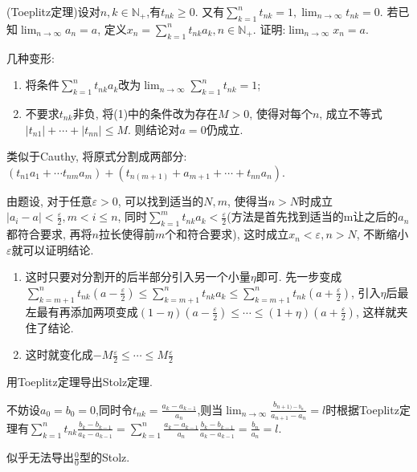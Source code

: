      \begin{exercise}
         (Toeplitz定理)设对$n,k\in \mathbb{N}_+$,有$t_{nk}\geqslant 0$. 又有$\sum_{k=1}^{n}t_{nk}=1, \lim_{n\to\infty}t_{nk}=0$. 若已知$\lim_{n\to\infty}a_n=a$, 定义$x_n=\sum_{k=1}^{n}t_{nk}a_k, n\in \mathbb{N}_+$. 证明:$\lim_{n\to\infty}x_n=a$.

         几种变形:
         \begin{enumerate}
             \item 将条件$\sum_{k=1}^{n}t_{nk}a_k$改为$\lim_{n\to\infty}\sum_{k=1}^{n}t_{nk}=1$;
             \item 不要求$t_{nk}$非负, 将(1)中的条件改为存在$M>0$, 使得对每个$n$, 成立不等式$|t_{n1}|+\cdots+|t_{nn}|\leqslant M$. 则结论对$a=0$仍成立.
         \end{enumerate}
     \end{exercise}
     \begin{solution}
         类似于Cauthy, 将原式分割成两部分:$(t_{n1}a_1+\cdots t_{nm}a_m)+(t_{n(m+1)}+a_{m+1}+\cdots+t_{nn}a_n)$.

         由题设, 对于任意$\varepsilon>0$, 可以找到适当的$N,m$, 使得当$n>N$时成立$|a_i-a|<\frac{\varepsilon}{2}, m<i \leqslant n$, 同时$\sum_{k=1}^{m}t_{nk}a_k<\frac{\varepsilon}{2}$(方法是首先找到适当的m让之后的$a_n$都符合要求, 再将$n$拉长使得前$m$个和符合要求), 这时成立$x_n<\varepsilon, n>N$, 不断缩小$\varepsilon$就可以证明结论.
     \end{solution}
     \begin{note}
         \begin{enumerate}
             \item 这时只要对分割开的后半部分引入另一个小量$\eta $即可. 先一步变成$\sum_{k=m+1}^{n}t_{nk}(a-\frac{\varepsilon}{2})\leqslant \sum_{k=m+1}^{n}t_{nk}a_k \leqslant \sum_{k=m+1}^{n}t_{nk}(a+\frac{\varepsilon}{2})$, 引入$\eta$后最左最有再添加两项变成$(1-\eta)(a-\frac{\varepsilon}{2})\leqslant \cdots \leqslant (1+\eta)(a+\frac{\varepsilon}{2})$, 这样就夹住了结论.
             \item 这时就变化成$-M\frac{\varepsilon}{2}\leqslant \cdots \leqslant M\frac{\varepsilon}{2}$
         \end{enumerate}
     \end{note}

     \begin{exercise}
         用Toeplitz定理导出Stolz定理.
     \end{exercise}
     \begin{solution}
         不妨设$a_0=b_0=0$,同时令$t_{nk}=\frac{a_k-a_{k-1}}{a_n}$,则当$\lim_{n\to\infty}\frac{b_{n+1)-b_n}}{a_{n+1}-a_n}=l$时根据Toeplitz定理有$\sum_{k=1}^{n}t_{nk}\frac{b_k-b_{k-1}}{a_k-a_{k-1}}=\sum_{k=1}^{n}\frac{a_k-a_{k-1}}{a_n}\frac{b_k-b_{k-1}}{a_k-a_{k-1}}=\frac{b_{n}}{a_{n}}=l$.
     \end{solution}
     \begin{note}
         似乎无法导出$\frac{0}{0}$型的Stolz.
     \end{note}

